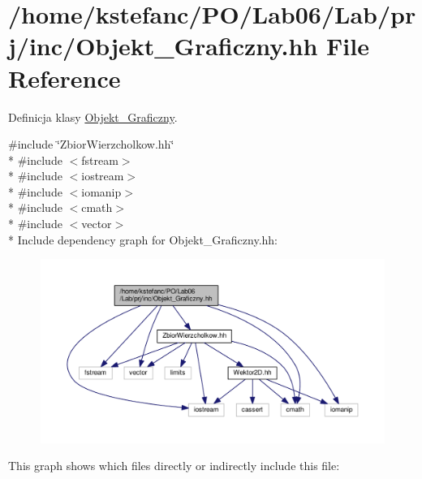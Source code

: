 \hypertarget{_objekt___graficzny_8hh}{\section{/home/kstefanc/\+P\+O/\+Lab06/\+Lab/prj/inc/\+Objekt\+\_\+\+Graficzny.hh File Reference}
\label{_objekt___graficzny_8hh}
}


Definicja klasy \hyperlink{class_objekt___graficzny}{Objekt\+\_\+\+Graficzny}.  


{\ttfamily \#include \char`\"{}Zbior\+Wierzcholkow.\+hh\char`\"{}}\\*
{\ttfamily \#include $<$fstream$>$}\\*
{\ttfamily \#include $<$iostream$>$}\\*
{\ttfamily \#include $<$iomanip$>$}\\*
{\ttfamily \#include $<$cmath$>$}\\*
{\ttfamily \#include $<$vector$>$}\\*
Include dependency graph for Objekt\+\_\+\+Graficzny.\+hh\+:\nopagebreak
\begin{figure}[H]
\begin{center}
\leavevmode
\includegraphics[width=350pt]{_objekt___graficzny_8hh__incl}
\end{center}
\end{figure}
This graph shows which files directly or indirectly include this file\+:\nopagebreak
